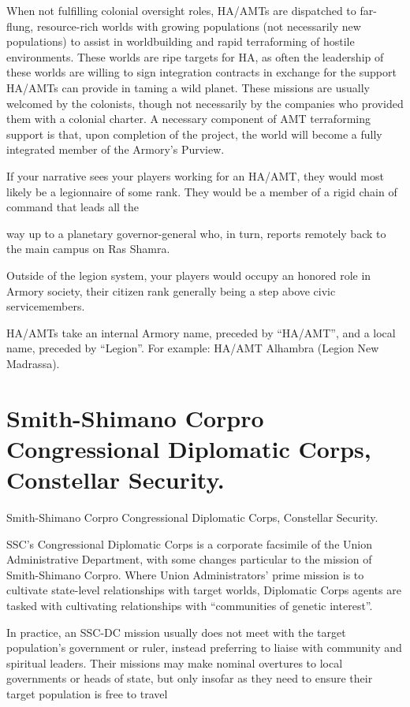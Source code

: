 When not fulfilling colonial oversight roles, HA/AMTs are dispatched to far-flung, resource-rich  
worlds with growing populations (not necessarily new populations) to assist in worldbuilding and  
rapid terraforming of hostile environments. These worlds are ripe targets for HA, as often the  
leadership of these worlds are willing to sign integration contracts in exchange for the support  
HA/AMTs can provide in taming a wild planet. These missions are usually welcomed by the  
colonists, though not necessarily by the companies who provided them with a colonial charter. A  
necessary component of AMT terraforming support is that, upon completion of the project, the  
world will become a fully integrated member of the Armory’s Purview.  
 

If your narrative sees your players working for an HA/AMT, they would most likely be a  
legionnaire of some rank. They would be a member of a rigid chain of command that leads all the  

                                                                                                          


way up to a planetary governor-general who, in turn, reports remotely back to the main campus  
on Ras Shamra. 
 

Outside of the legion system, your players would occupy an honored role in Armory society, their  
citizen rank generally being a step above civic servicemembers.
 

HA/AMTs take an internal Armory name, preceded by “HA/AMT”, and a local name, preceded by  
“Legion”. For example: HA/AMT Alhambra (Legion New Madrassa).  
 
\section{Smith-Shimano Corpro Congressional Diplomatic Corps, Constellar Security.}
Smith-Shimano Corpro Congressional Diplomatic Corps, Constellar  
Security.   

SSC’s Congressional Diplomatic Corps is a corporate facsimile of the Union Administrative  
Department, with some changes particular to the mission of Smith-Shimano Corpro. Where Union  
Administrators’ prime mission is to cultivate state-level relationships with target worlds, Diplomatic  
Corps agents are tasked with cultivating relationships with “communities of genetic interest”.   

In practice, an SSC-DC mission usually does not meet with the target population’s government or  
ruler, instead preferring to liaise with community and spiritual leaders. Their missions may make  
nominal overtures to local governments or heads of state, but only insofar as they need to ensure  
their target population is free to travel  


